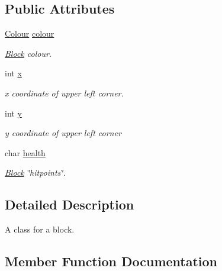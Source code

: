 \subsection*{Public Attributes}
\begin{DoxyCompactItemize}
\item 
\hyperlink{struct_colour}{Colour} \hyperlink{class_block_acb5551f2233e2a97b9d9e7ab40590e33}{colour}
\begin{DoxyCompactList}\small\item\em \hyperlink{class_block}{Block} colour. \end{DoxyCompactList}\item 
\mbox{\label{class_block_a13d0a6d225233353862fa5adcbadf661}} 
int \hyperlink{class_block_a13d0a6d225233353862fa5adcbadf661}{x}
\begin{DoxyCompactList}\small\item\em x coordinate of upper left corner. \end{DoxyCompactList}\item 
\mbox{\label{class_block_a9328d6b6fcc9f9c019d091d87ceda41c}} 
int \hyperlink{class_block_a9328d6b6fcc9f9c019d091d87ceda41c}{y}
\begin{DoxyCompactList}\small\item\em y coordinate of upper left corner \end{DoxyCompactList}\item 
char \hyperlink{class_block_a5e2a1909ae2f2572cd75b2c38d3abddb}{health}
\begin{DoxyCompactList}\small\item\em \hyperlink{class_block}{Block} \char`\"{}hitpoints\char`\"{}. \end{DoxyCompactList}\end{DoxyCompactItemize}


\subsection{Detailed Description}
A class for a block. 

\subsection{Member Function Documentation}
\mbox{\label{class_block_aabe6fcade4ece2795cf4ada1f0241442}} 
